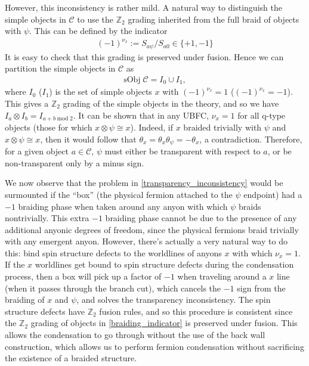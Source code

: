 \documentclass[12pt,a4paper]{article}
\newcommand{\tp}{\otimes}
\newcommand{\mcc}{\mathcal{C}}
\newcommand{\zt}{\mathbb{Z}_2}
\begin{document}
However, this inconsistency is rather mild. 
A natural way to distinguish the simple objects in $\mcc$ to use the $\mathbb{Z}_2$ 
grading inherited from the full braid of objects with $\psi$. 
This can be defined by the indicator 
\begin{align}
(-1)^{\nu_x} := S_{a \psi}/S_{a0} \in \{+1, -1 \}
\label{grading}
\end{align}
It is easy to check that this grading is preserved under fusion.
Hence we can partition the simple objects in $\mcc$ as 
\begin{align} \label{braiding_indicator}
\text{sObj}\; \mathcal{C}  = I_0 \cup I_1,
\end{align}
where $I_0$ ($I_1$) is the set of simple objects $x$ with $(-1)^{\nu_x} = 1$ ($(-1)^{\nu_x} = -1$).
This gives a $\zt$ grading of the simple objects in the theory, and so we have $I_a \tp I_b = I_{a+b\; \text{mod} \; 2}$. 
It can be shown that in any UBFC, $\nu_x = 1$ for all q-type objects (those for which $x\tp \psi \cong x$).
Indeed, if $x$ braided trivially with $\psi$ and $x\tp \psi \cong x$, then it would follow that
$\theta_x = \theta_x \theta_\psi = -\theta_x$, a contradiction.
Therefore, for a given object $a\in\mcc$, $\psi$ must either be transparent with respect to $a$, or be non-transparent only by a minus sign. 

We now observe that the problem in \eqref{transparency_inconsistency} would be 
surmounted if the ``box'' (the physical fermion attached to the $\psi$ endpoint) had a $-1$ 
braiding phase when taken around any anyon with which $\psi$ braids nontrivially. 
This extra $-1$ braiding phase cannot be due to the presence of any additional anyonic 
degrees of freedom, since the physical fermions braid trivially with any emergent anyon. 
However, there's actually a very natural way to do this: bind spin structure defects to the 
worldlines of anyons $x$ with which $\nu_x=1$. 
If the $x$ worldlines get bound to spin structure defects during the condensation 
process, then a box will pick up a factor of $-1$ when traveling around a $x$ line 
(when it passes through the branch cut), which cancels the $-1$ sign from the braiding of 
$x$ and $\psi$, and solves the transparency inconsistency. 
The spin structure defects have $\zt$ fusion rules, and so this procedure is consistent since 
the $\zt$ grading of objects in \eqref{braiding_indicator} is preserved under fusion. 
This allows the condensation to go through without the use of the back wall construction, 
which allows us to perform fermion condensation without sacrificing the existence of a 
braided structure. 
\end{document}
